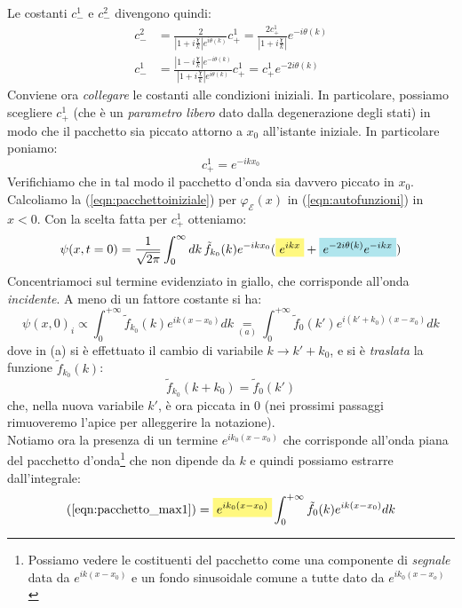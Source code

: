 \documentclass[../../FisicaTeorica.tex]{subfiles}
\begin{document}
Le costanti $c_-^1$ e $c_-^2$ divengono quindi:
\begin{align}
c^2_- &= \frac{2}{|1+i\frac{\chi}{k}|e^{i\theta(k)}}c^1_+ = \frac{2 c^1_+}{|1+i\frac{\chi}{k}|}e^{-i\theta(k)}
\label{eqn:c2-}
\\
c^1_- &= \frac{|1-i\frac{\chi}{k}|e^{-i\theta(k)}}{|1+i\frac{\chi}{k}|e^{i\theta(k)}}c^1_+ = c^1_+ e^{-2i\theta(k)}
\label{eqn:c1-}
\end{align}
Conviene ora \textit{collegare} le costanti alle condizioni iniziali. In particolare, possiamo scegliere $c^1_+$ (che è un \textit{parametro libero} dato dalla degenerazione degli stati) in modo che il pacchetto sia piccato attorno a $x_0$ all'istante iniziale. In particolare poniamo:
\begin{equation}
c^1_+ = e^{-ikx_0}
\label{eqn:c1+}
\end{equation}
Verifichiamo che in tal modo il pacchetto d'onda sia davvero piccato in $x_0$. Calcoliamo la (\ref{eqn:pacchettoiniziale}) per $\varphi_\mathcal{E}(x)$ in (\ref{eqn:autofunzioni}) in $x<0$. Con la scelta fatta per $c^1_+$ otteniamo:
\begin{equation}
\psi(x,t=0)=\frac{1}{\sqrt{2\pi}}\int_0^\infty dk\, \tilde{f}_{k_0}(k) e^{-ikx_0}(\hlc{Yellow}{e^{ikx}}+\hlc{SkyBlue}{e^{-2i\theta(k)}e^{-ikx}})
\label{eqn:pacchettonegativo}
\end{equation}
Concentriamoci sul termine evidenziato in giallo, che corrisponde all'onda \textit{incidente}. A meno di un fattore costante si ha:
\begin{equation}
\psi(x,0)_i\propto \int_0^{+\infty}\tilde{f}_{k_0}(k) e^{ik(x-x_0)} dk \underset{(a)}{=}\int_0^{+\infty} \tilde{f}_{0}(k')e^{i(k'+k_0)(x-x_0)}dk
\label{eqn:pacchetto_max1}
\end{equation}
dove in (a) si è effettuato il cambio di variabile $k\to k'+k_0$, e si è \textit{traslata} la funzione $\tilde{f}_{k_0}(k)$:
\[
\tilde{f}_{k_0}(k+k_0) = \tilde{f}_{0}(k')
\]
che, nella nuova variabile $k'$, è ora piccata in $0$ (nei prossimi passaggi rimuoveremo l'apice per alleggerire la notazione).\\
Notiamo ora la presenza di un termine $e^{ik_0(x-x_0)}$ che corrisponde all'onda piana  del pacchetto d'onda\footnote{Possiamo vedere le costituenti del pacchetto come una componente di \textit{segnale} data da $e^{ik(x-x_0)}$ e un fondo sinusoidale comune a tutte dato da $e^{ik_0(x-x_o)}$}
 che non dipende da $k$ e quindi possiamo estrarre dall'integrale:
\begin{equation}
(\ref{eqn:pacchetto_max1}) = \hlc{Yellow}{e^{ik_0(x-x_0)}}\int_0^{+\infty} \tilde{f}_0(k) e^{ik(x-x_0)}dk
\label{eqn:pacchetto_max2}
\end{equation}
\end{document}
